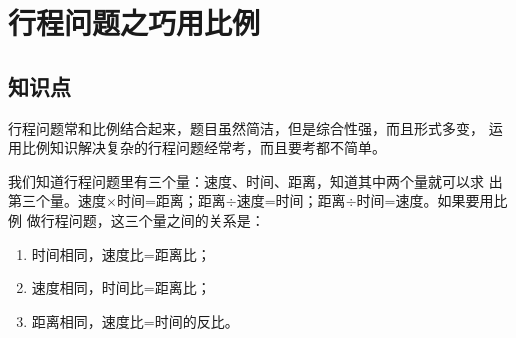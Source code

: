 \chapter{行程问题之巧用比例}
\section{知识点}
行程问题常和比例结合起来，题目虽然简洁，但是综合性强，而且形式多变，
运用比例知识解决复杂的行程问题经常考，而且要考都不简单。\par
我们知道行程问题里有三个量：速度、时间、距离，知道其中两个量就可以求
出第三个量。速度$\times$时间=距离；距离$\div$速度=时间；距离$\div$时间=速度。如果要用比例
做行程问题，这三个量之间的关系是：\par
\begin{enumerate}
\item 时间相同，速度比=距离比；
\item  速度相同，时间比=距离比；
\item  距离相同，速度比=时间的反比。
\end{enumerate}
